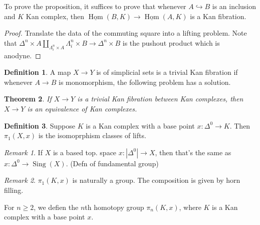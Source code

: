 \documentclass{article}
\theoremstyle{definition}
\newtheorem{defn}{Definition}[section]
\theoremstyle{remark}
\newtheorem{rem}{Remark}
\theoremstyle{plain}
\newtheorem{thm}[defn]{Theorem}
\newcommand{\Hom}{\operatorname{Hom}}
\newcommand{\sing}{\operatorname{Sing}}
\begin{document}
To prove the proposition, it suffices to prove that whenever $A\hookrightarrow B$ is an inclusion and $K$ Kan complex, then $\underline{\Hom}(B,K)\to\underline{\Hom}(A,K)$ is a Kan fibration.
\begin{proof}
    Translate the data of the commuting square into a lifting problem. Note that $\Delta^n\times A\coprod_{\Lambda_i^n\times A}\Lambda_i^n\times B\to \Delta^n\times B$ is the pushout product which is anodyne.
\end{proof}

\begin{defn}
    A map $X\to Y$ is of simplicial sets is a trivial Kan fibration if whenever $A\to B$ is monomorphism, the following problem has a solution.
    \begin{center}
    \end{center}
\end{defn}
\begin{thm}
    If $X\to Y$ is a trivial Kan fibration between Kan complexes, then $X\to Y$ is an equivalence of Kan complexes.
\end{thm}
\begin{defn}
    Suppose $K$ is a Kan complex with a base point $x:\Delta^0\to K$. Then $\pi_1(X,x)$ is the isomoprphism classes of lifts.
    \begin{center}
    \end{center}
\end{defn}
\begin{rem}
    If $X$ is a based top. space $x:|\Delta^0|\to X$, then that's the same as $x:\Delta^0\to \sing(X)$. (Defn of fundamental group)
\end{rem}
\begin{rem}
    $\pi_1(K,x)$ is naturally a group. The composition is given by horn filling.
\end{rem}
For $n\ge 2$, we defien the $n$th homotopy group $\pi_n(K,x)$, where $K$ is a Kan complex with a base point $x$.
\end{document}
